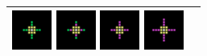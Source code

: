 \begin{figure}[H]
{\begin{adjustbox}{width=10cm,center}
\begin{tabular}{ll}
{            \includegraphics[width=1.3cm]{src/patterns/maps/pixel_pattern_7.png}%
\includegraphics[width=1.3cm]{src/patterns/maps/pixel_pattern_8.png}%
\includegraphics[width=1.3cm]{src/patterns/maps/pixel_pattern_9.png}%
\includegraphics[width=1.3cm]{src/patterns/maps/pixel_pattern_10.png}%
        } \\                                                                   
        \midrule
      \end{tabular}                                                            
    \end{adjustbox}                                                            
  }                                                                            
\end{figure}                                                                   
